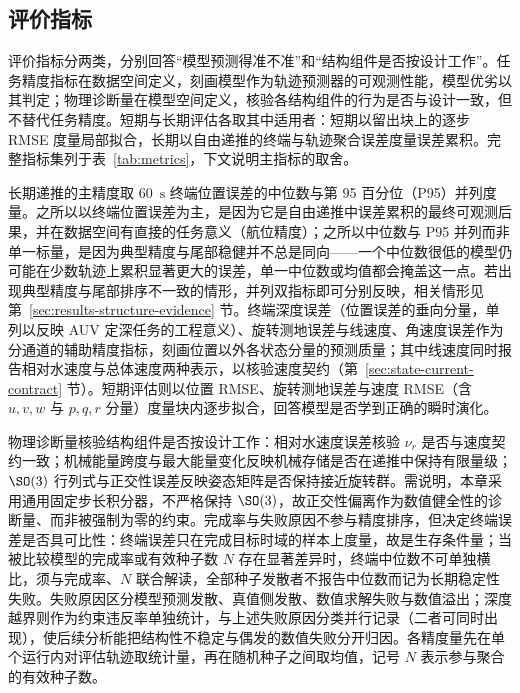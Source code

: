 \subsection{评价指标}
\label{subsec:metrics}

评价指标分两类，分别回答“模型预测得准不准”和“结构组件是否按设计工作”。任务精度指标在数据空间定义，刻画模型作为轨迹预测器的可观测性能，模型优劣以其判定；物理诊断量在模型空间定义，核验各结构组件的行为是否与设计一致，但不替代任务精度。短期与长期评估各取其中适用者：短期以留出块上的逐步 RMSE 度量局部拟合，长期以自由递推的终端与轨迹聚合误差度量误差累积。完整指标集列于表~\ref{tab:metrics}，下文说明主指标的取舍。

长期递推的主精度取 60~\(\mathrm{s}\) 终端位置误差的中位数与第 95 百分位（P95）并列度量。之所以以终端位置误差为主，是因为它是自由递推中误差累积的最终可观测后果，并在数据空间有直接的任务意义（航位精度）；之所以中位数与 P95 并列而非单一标量，是因为典型精度与尾部稳健并不总是同向——一个中位数很低的模型仍可能在少数轨迹上累积显著更大的误差，单一中位数或均值都会掩盖这一点。若出现典型精度与尾部排序不一致的情形，并列双指标即可分别反映，相关情形见第~\ref{sec:results-structure-evidence} 节。终端深度误差（位置误差的垂向分量，单列以反映 AUV 定深任务的工程意义）、旋转测地误差与线速度、角速度误差作为分通道的辅助精度指标，刻画位置以外各状态分量的预测质量；其中线速度同时报告相对水速度与总体速度两种表示，以核验速度契约（第~\ref{sec:state-current-contract} 节）。短期评估则以位置 RMSE、旋转测地误差与速度 RMSE（含 \(u,v,w\) 与 \(p,q,r\) 分量）度量块内逐步拟合，回答模型是否学到正确的瞬时演化。

物理诊断量核验结构组件是否按设计工作：相对水速度误差核验 \(\nu_r\) 是否与速度契约一致；机械能量跨度与最大能量变化反映机械存储是否在递推中保持有限量级；\(\SO(3)\) 行列式与正交性误差反映姿态矩阵是否保持接近旋转群。需说明，本章采用通用固定步长积分器，不严格保持 \(\SO(3)\)，故正交性偏离作为数值健全性的诊断量、而非被强制为零的约束。完成率与失败原因不参与精度排序，但决定终端误差是否具可比性：终端误差只在完成目标时域的样本上度量，故是生存条件量；当被比较模型的完成率或有效种子数 \(N\) 存在显著差异时，终端中位数不可单独横比，须与完成率、\(N\) 联合解读，全部种子发散者不报告中位数而记为长期稳定性失败。失败原因区分模型预测发散、真值侧发散、数值求解失败与数值溢出；深度越界则作为约束违反率单独统计，与上述失败原因分类并行记录（二者可同时出现），使后续分析能把结构性不稳定与偶发的数值失败分开归因。各精度量先在单个运行内对评估轨迹取统计量，再在随机种子之间取均值，记号 \(N\) 表示参与聚合的有效种子数。

